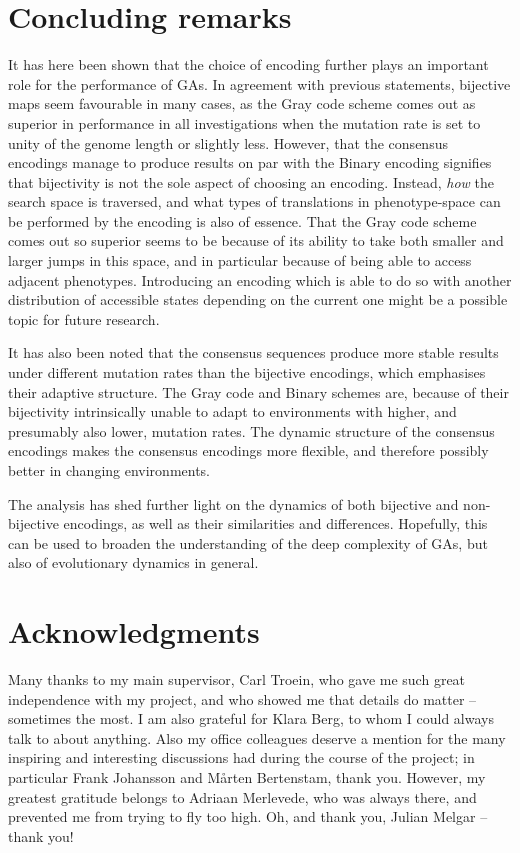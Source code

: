 \documentclass[a4paper,12pt]{article}
\theoremstyle{plain}
\theoremstyle{definition}
\begin{document}
\section{Concluding remarks}
   It has here been shown that the choice of encoding further plays an important
   role for the performance of GAs. In agreement with previous statements,
   bijective maps seem favourable in many cases, as the Gray code scheme comes
   out as superior in performance in all investigations when the mutation rate
   is set to unity of the genome length or slightly less. However, that the
   consensus encodings manage to produce results on par with the Binary encoding
   signifies that bijectivity is not the sole aspect of choosing an encoding.
   Instead, \textit{how} the search space is traversed, and what types of
   translations in phenotype-space can be performed by the encoding is also of
   essence. That the Gray code scheme comes out so superior seems to be
   because of its ability to take both smaller and larger jumps in this space,
   and in particular because of being able to access adjacent phenotypes.
   Introducing an encoding which is able to do so with another distribution
   of accessible states depending on the current one might be a possible topic 
   for future research. 
      
   It has also been noted that the consensus sequences produce more stable results under
   different mutation rates than the bijective encodings, which emphasises their adaptive 
   structure. The Gray code and Binary schemes are, because of their bijectivity 
   intrinsically unable to adapt to environments with higher, and presumably 
   also lower, mutation rates. The dynamic structure of the consensus encodings makes 
   the consensus encodings more flexible, and therefore possibly better in changing
   environments. 

   The analysis has shed further light on the dynamics
   of both bijective and non-bijective encodings, as well as their similarities
   and differences. Hopefully, this can be used to broaden 
   the understanding of the deep complexity of GAs, but also of evolutionary dynamics 
   in general. 

\section*{Acknowledgments}
   Many thanks to my main supervisor, Carl Troein, who gave me such great
   independence with my project, and who showed me that details do matter --
   sometimes the most. I am also
   grateful for Klara Berg, to whom I could always talk to about anything. Also my office 
   colleagues deserve a mention for the many inspiring and interesting discussions had 
   during the course of the project; in particular Frank Johansson and Mårten Bertenstam, 
   thank you. However, my greatest gratitude belongs to Adriaan Merlevede, who was 
   always there, and prevented me from trying to fly too high. Oh, and thank you, 
   Julian Melgar -- thank you!
   
\end{document}
